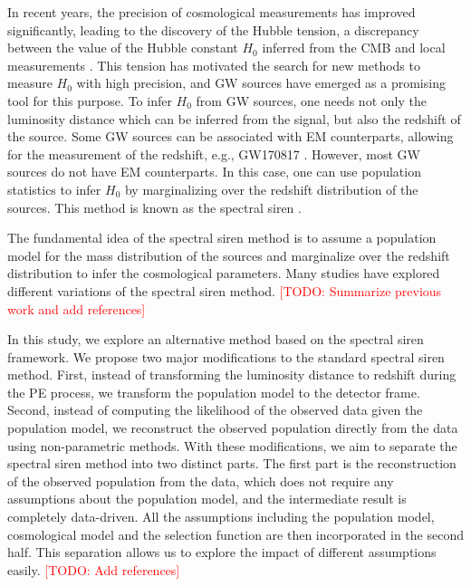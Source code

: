 \documentclass[aps,prd,twocolumn,superscriptaddress,preprintnumbers,nofootinbib,hidelinks]{revtex4-2}
\newcommand{\todo}[1]{\textcolor{red}{[TODO: #1]}}
\begin{document}
In recent years, the precision of cosmological measurements has improved significantly, leading to the discovery of the Hubble tension, a discrepancy between the value of the Hubble constant $H_0$ inferred from the \ac{CMB} \citep{Planck:2018vyg} and local measurements \citep{Riess:2021jrx}.
This tension has motivated the search for new methods to measure $H_0$ with high precision, and \ac{GW} sources have emerged as a promising tool for this purpose.
To infer $H_0$ from \ac{GW} sources, one needs not only the luminosity distance which can be inferred from the signal, but also the redshift of the source.
Some \ac{GW} sources can be associated with \ac{EM} counterparts, allowing for the measurement of the redshift, e.g., GW170817 \citep{LIGOScientific:2017adf, Guidorzi:2017ogy}.
However, most \ac{GW} sources do not have \ac{EM} counterparts.
In this case, one can use population statistics to infer $H_0$ by marginalizing over the redshift distribution of the sources.
This method is known as the spectral siren \citep{You:2020wju, Mastrogiovanni:2021wsd, LIGOScientific:2021aug, Ezquiaga:2022zkx}.

The fundamental idea of the spectral siren method is to assume a population model for the mass distribution of the sources and marginalize over the redshift distribution to infer the cosmological parameters.
Many studies have explored different variations of the spectral siren method.
\todo{Summarize previous work and add references}

In this study, we explore an alternative method based on the spectral siren framework.
We propose two major modifications to the standard spectral siren method.
First, instead of transforming the luminosity distance to redshift during the \ac{PE} process, we transform the population model to the detector frame.
Second, instead of computing the likelihood of the observed data given the population model, we reconstruct the observed population directly from the data using non-parametric methods.
With these modifications, we aim to separate the spectral siren method into two distinct parts.
The first part is the reconstruction of the observed population from the data, which does not require any assumptions about the population model, and the intermediate result is completely data-driven.
All the assumptions including the population model, cosmological model and the selection function are then incorporated in the second half.
This separation allows us to explore the impact of different assumptions easily.
\todo{Add references}
\end{document}
